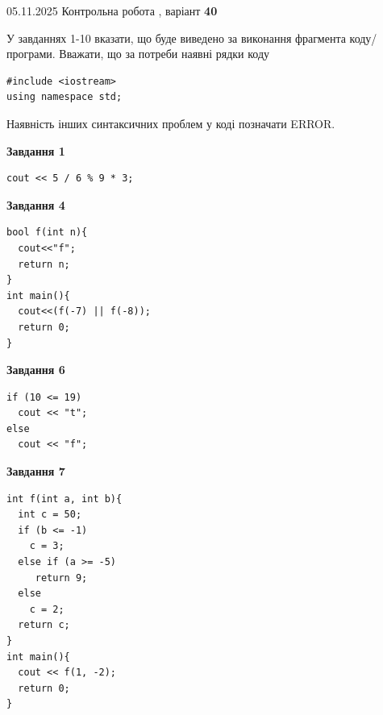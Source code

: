 \documentclass[12pt, ukrainian]{article}
\begin{document}
\newpage

{\Large{05.11.2025 Контрольна робота , варіант  \No \textbf { 40 }\par}}
{
\begin {large}
У завданнях 1-10 вказати, що буде виведено за виконання фрагмента коду/про\-гра\-ми.
Вважати, що за потреби наявні рядки коду
\begin{verbatim}
#include <iostream>
using namespace std;
\end{verbatim}
Наявність інших синтаксичних проблем у коді позначати ERROR.

\begin{minipage}[t]{7.0cm}

\begin{center}
\textbf{Завдання 1}
\end{center}
\vspace{-8mm}

\begin{verbatim}
cout << 5 / 6 % 9 * 3;
\end{verbatim}



\begin{center}
\textbf{Завдання 4}
\end{center}
\vspace{-8mm}

\begin{verbatim}
bool f(int n){
  cout<<"f";
  return n;
}
int main(){
  cout<<(f(-7) || f(-8));
  return 0;
}
\end{verbatim}



\begin{center}
\textbf{Завдання 6}
\end{center}
\vspace{-8mm}

\begin{verbatim}
if (10 <= 19)
  cout << "t";
else
  cout << "f";
\end{verbatim}



\begin{center}
\textbf{Завдання 7}
\end{center}
\vspace{-8mm}

\begin{verbatim}
int f(int a, int b){
  int c = 50;
  if (b <= -1)
    c = 3;
  else if (a >= -5)
     return 9;
  else
    c = 2;
  return c;
}
int main(){
  cout << f(1, -2);
  return 0;
}
\end{verbatim}


\end{minipage}
\end{large}}
\end{document}
